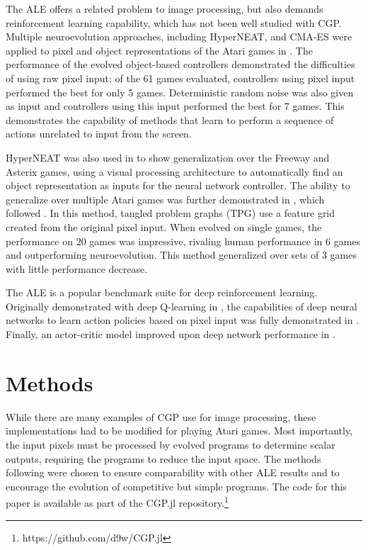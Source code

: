 \documentclass[sigconf,screen]{acmart}\settopmatter{printfolios=true,printacmref=false}
\begin{document}
The ALE offers a related problem to image processing, but also demands
reinforcement learning capability, which has not been well studied with CGP.
Multiple neuroevolution approaches, including HyperNEAT, and CMA-ES were applied
to pixel and object representations of the Atari games in
\citet{hausknecht2014neuroevolution}. The performance of the evolved object-based
controllers demonstrated the difficulties of using raw pixel input; of the 61
games evaluated, controllers using pixel input performed the best for only 5
games. Deterministic random noise was also given as input and controllers using
this input performed the best for 7 games. This demonstrates the capability of
methods that learn to perform a sequence of actions unrelated to input from the
screen.

HyperNEAT was also used in \citet{hausknecht2012hyperneat} to show
generalization over the Freeway and Asterix games, using a visual processing
architecture to automatically find an object representation as inputs for the
neural network controller. The ability to generalize over multiple Atari games
was further demonstrated in \citet{kelly2017multi}, which followed
\citet{kelly2017emergent}. In this method, tangled problem graphs (TPG) use a
feature grid created from the original pixel input. When evolved on single
games, the performance on 20 games was impressive, rivaling human performance in
6 games and outperforming neuroevolution. This method generalized over sets of 3
games with little performance decrease.



The ALE is a popular benchmark suite for deep reinforcement learning. Originally
demonstrated with deep Q-learning in \citet{mnih2013playing}, the capabilities of
deep neural networks to learn action policies based on pixel input was fully
demonstrated in \citet{mnih2015human}. Finally, an actor-critic model improved
upon deep network performance in \citet{mnih2016asynchronous}.
 \section{Methods}
\label{sec:methods}

While there are many examples of CGP use for image processing, these
implementations had to be modified for playing Atari games. Most importantly,
the input pixels must be processed by evolved programs to determine scalar
outputs, requiring the programs to reduce the input space. The methods following
were chosen to ensure comparability with other ALE results and to encourage the
evolution of competitive but simple programs. The code for this paper is
available as part of the CGP.jl
repository.\footnote{https://github.com/d9w/CGP.jl}
\end{document}
